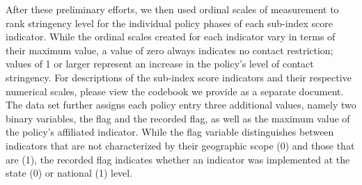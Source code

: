 After these preliminary efforts, we then used ordinal scales of measurement to rank stringency level for the individual policy phases of each sub-index score indicator. While the ordinal scales created for each indicator vary in terms of their maximum value, a value of zero always indicates no contact restriction; values of 1 or larger represent an increase in the policy’s level of contact stringency. For descriptions of the sub-index score indicators and their respective numerical scales, please view the codebook we provide as a separate document. The data set further assigns each policy entry three additional values, namely two binary variables, the flag and the recorded flag, as well as the maximum value of the policy’s affiliated indicator. While the flag variable distinguishes between indicators that are not characterized by their geographic scope (0) and those that are (1), the recorded flag indicates whether an indicator was implemented at the state (0) or national (1) level.